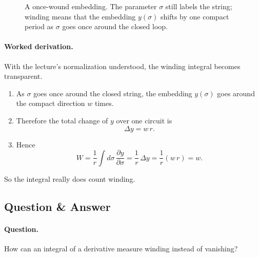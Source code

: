 \begin{figure}[htbp]
\centering
{}
\caption{A once-wound embedding. The parameter \(\sigma\) still labels the string; winding means that the embedding \(y(\sigma)\) shifts by one compact period as \(\sigma\) goes once around the closed loop.}
\end{figure}

\paragraph{Worked derivation.} With the lecture's normalization understood, the winding integral becomes transparent.
\begin{enumerate}
\item As \(\sigma\) goes once around the closed string, the embedding \(y(\sigma)\) goes around the compact direction \(w\) times.
\item Therefore the total change of \(y\) over one circuit is
\begin{equation}
\Delta y = w\,r.
\end{equation}
\item Hence
\begin{equation}
W=\frac{1}{r}\int d\sigma\,\frac{\partial y}{\partial \sigma}
 =\frac{1}{r}\,\Delta y
 =\frac{1}{r}(w\,r)
 =w.
\end{equation}
\end{enumerate}
So the integral really does count winding.

\subsection{Question \& Answer}

\paragraph{Question.} How can an integral of a derivative measure winding instead of vanishing?

